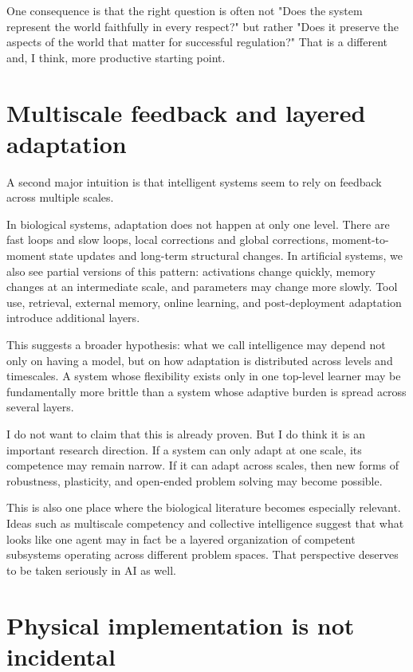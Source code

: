 \documentclass[11pt]{article}
\begin{document}
One consequence is that the right question is often not "Does the system represent the world faithfully in every respect?" but rather "Does it preserve the aspects of the world that matter for successful regulation?" That is a different and, I think, more productive starting point.

\section{Multiscale feedback and layered adaptation}

A second major intuition is that intelligent systems seem to rely on feedback across multiple scales.

In biological systems, adaptation does not happen at only one level. There are fast loops and slow loops, local corrections and global corrections, moment-to-moment state updates and long-term structural changes. In artificial systems, we also see partial versions of this pattern: activations change quickly, memory changes at an intermediate scale, and parameters may change more slowly. Tool use, retrieval, external memory, online learning, and post-deployment adaptation introduce additional layers.

This suggests a broader hypothesis: what we call intelligence may depend not only on having a model, but on how adaptation is distributed across levels and timescales. A system whose flexibility exists only in one top-level learner may be fundamentally more brittle than a system whose adaptive burden is spread across several layers.

I do not want to claim that this is already proven. But I do think it is an important research direction. If a system can only adapt at one scale, its competence may remain narrow. If it can adapt across scales, then new forms of robustness, plasticity, and open-ended problem solving may become possible.

This is also one place where the biological literature becomes especially relevant. Ideas such as multiscale competency and collective intelligence suggest that what looks like one agent may in fact be a layered organization of competent subsystems operating across different problem spaces. That perspective deserves to be taken seriously in AI as well.

\section{Physical implementation is not incidental}
\end{document}
